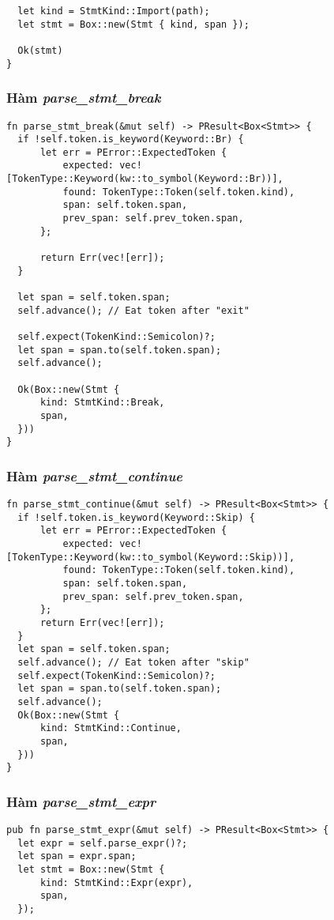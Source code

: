 {\begin{lstlisting}
  let kind = StmtKind::Import(path);
  let stmt = Box::new(Stmt { kind, span });

  Ok(stmt)
}
\end{lstlisting}

\subsubsection{Hàm \textit{parse\_stmt\_break}}
\label{ap1:stmt_br}
\begin{lstlisting}
fn parse_stmt_break(&mut self) -> PResult<Box<Stmt>> {
  if !self.token.is_keyword(Keyword::Br) {
      let err = PError::ExpectedToken {
          expected: vec![TokenType::Keyword(kw::to_symbol(Keyword::Br))],
          found: TokenType::Token(self.token.kind),
          span: self.token.span,
          prev_span: self.prev_token.span,
      };

      return Err(vec![err]);
  }

  let span = self.token.span;
  self.advance(); // Eat token after "exit"

  self.expect(TokenKind::Semicolon)?;
  let span = span.to(self.token.span);
  self.advance();

  Ok(Box::new(Stmt {
      kind: StmtKind::Break,
      span,
  }))
}
\end{lstlisting}

\subsubsection{Hàm \textit{parse\_stmt\_continue}}
\label{ap1:stmt_skip}
\begin{lstlisting}
fn parse_stmt_continue(&mut self) -> PResult<Box<Stmt>> {
  if !self.token.is_keyword(Keyword::Skip) {
      let err = PError::ExpectedToken {
          expected: vec![TokenType::Keyword(kw::to_symbol(Keyword::Skip))],
          found: TokenType::Token(self.token.kind),
          span: self.token.span,
          prev_span: self.prev_token.span,
      };
      return Err(vec![err]);
  }
  let span = self.token.span;
  self.advance(); // Eat token after "skip"
  self.expect(TokenKind::Semicolon)?;
  let span = span.to(self.token.span);
  self.advance();
  Ok(Box::new(Stmt {
      kind: StmtKind::Continue,
      span,
  }))
}
\end{lstlisting}

\subsubsection{Hàm \textit{parse\_stmt\_expr}}
\label{ap1:stmt_expr}
\begin{lstlisting}
pub fn parse_stmt_expr(&mut self) -> PResult<Box<Stmt>> {
  let expr = self.parse_expr()?;
  let span = expr.span;
  let stmt = Box::new(Stmt {
      kind: StmtKind::Expr(expr),
      span,
  });


\end{lstlisting}}
